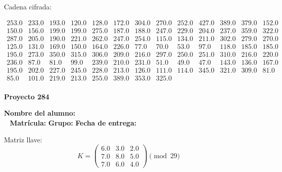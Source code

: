 \documentclass[12pt]{article}
\begin{document}
Cadena cifrada:
\begin{center}
$\begin{array}{lllllllllllll}
253.0 & 233.0 & 193.0 & 120.0 & 128.0 & 172.0 & 304.0 & 270.0 & 252.0 & 427.0 & 389.0 & 379.0 & 152.0\\
150.0 & 156.0 & 199.0 & 199.0 & 275.0 & 187.0 & 188.0 & 247.0 & 229.0 & 204.0 & 237.0 & 359.0 & 322.0\\
287.0 & 205.0 & 190.0 & 221.0 & 262.0 & 247.0 & 254.0 & 115.0 & 134.0 & 211.0 & 302.0 & 279.0 & 270.0\\
125.0 & 131.0 & 169.0 & 150.0 & 164.0 & 226.0 & 77.0 & 70.0 & 53.0 & 97.0 & 118.0 & 185.0 & 185.0\\
195.0 & 273.0 & 350.0 & 315.0 & 306.0 & 209.0 & 216.0 & 297.0 & 250.0 & 251.0 & 310.0 & 216.0 & 220.0\\
236.0 & 87.0 & 81.0 & 99.0 & 239.0 & 210.0 & 231.0 & 51.0 & 49.0 & 47.0 & 143.0 & 136.0 & 167.0\\
195.0 & 202.0 & 227.0 & 245.0 & 228.0 & 213.0 & 126.0 & 111.0 & 114.0 & 345.0 & 321.0 & 309.0 & 81.0\\
85.0 & 101.0 & 219.0 & 213.0 & 255.0 & 389.0 & 353.0 & 325.0\\
\end{array}$
\end{center}

\newpage


\textbf{Proyecto 284}

\textbf{Nombre del alumno:} \underline{\hspace{13cm}}\\\
\vspace{1cm}
\textbf{Matrícula:} \underline{\hspace{4cm}} \hspace{1cm}
\textbf{Grupo:} \underline{\hspace{2cm}}
\textbf{Fecha de entrega:} \underline{\hspace{2cm}}

\medskip

Matriz llave:
\[
K = \begin{pmatrix}
6.0 & 3.0 & 2.0\\
7.0 & 8.0 & 5.0\\
7.0 & 6.0 & 4.0
\end{pmatrix} \pmod{29}
\]
\end{document}
